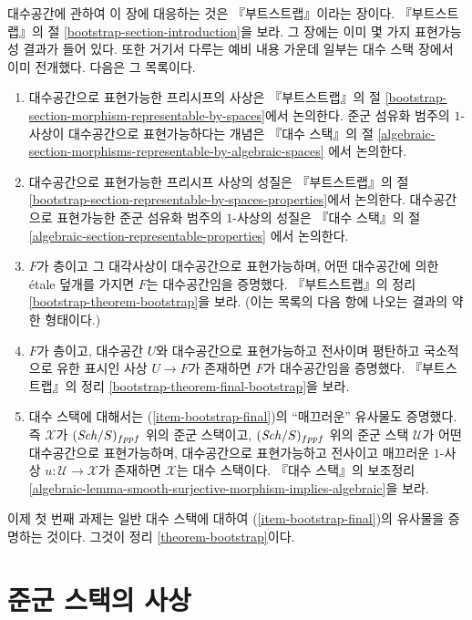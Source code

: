 \noindent
대수공간에 관하여 이 장에 대응하는 것은 『부트스트랩』이라는 장이다.
『부트스트랩』의 절 \ref{bootstrap-section-introduction}을 보라.
그 장에는 이미 몇 가지 표현가능성 결과가 들어 있다. 또한 거기서 다루는
예비 내용 가운데 일부는 대수 스택 장에서 이미 전개했다. 다음은 그 목록이다.
\begin{enumerate}
\item 대수공간으로 표현가능한 프리시프의 사상은 『부트스트랩』의 절
\ref{bootstrap-section-morphism-representable-by-spaces}에서 논의한다.
준군 섬유화 범주의 $1$-사상이 대수공간으로 표현가능하다는 개념은
『대수 스택』의 절
\ref{algebraic-section-morphisms-representable-by-algebraic-spaces}
에서 논의한다.
\item 대수공간으로 표현가능한 프리시프 사상의 성질은
『부트스트랩』의 절
\ref{bootstrap-section-representable-by-spaces-properties}에서 논의한다.
대수공간으로 표현가능한 준군 섬유화 범주의 $1$-사상의 성질은
『대수 스택』의 절
\ref{algebraic-section-representable-properties}
에서 논의한다.
\item $F$가 층이고 그 대각사상이 대수공간으로 표현가능하며,
어떤 대수공간에 의한 \'etale 덮개를 가지면 $F$는 대수공간임을 증명했다.
『부트스트랩』의 정리 \ref{bootstrap-theorem-bootstrap}을 보라.
(이는 목록의 다음 항에 나오는 결과의 약한 형태이다.)
\item
\label{item-bootstrap-final}
$F$가 층이고, 대수공간 $U$와 대수공간으로 표현가능하고 전사이며
평탄하고 국소적으로 유한 표시인 사상 $U \to F$가 존재하면
$F$가 대수공간임을 증명했다. 『부트스트랩』의 정리
\ref{bootstrap-theorem-final-bootstrap}을 보라.
\item 대수 스택에 대해서는 (\ref{item-bootstrap-final})의
“매끄러운” 유사물도 증명했다. 즉 $\mathcal{X}$가
$(\mathit{Sch}/S)_{fppf}$ 위의 준군 스택이고, $(\mathit{Sch}/S)_{fppf}$ 위의
준군 스택 $\mathcal{U}$가 어떤 대수공간으로 표현가능하며,
대수공간으로 표현가능하고 전사이고 매끄러운 $1$-사상
$u : \mathcal{U} \to \mathcal{X}$가 존재하면
$\mathcal{X}$는 대수 스택이다. 『대수 스택』의 보조정리
\ref{algebraic-lemma-smooth-surjective-morphism-implies-algebraic}을 보라.
\end{enumerate}
이제 첫 번째 과제는 일반 대수 스택에 대하여
(\ref{item-bootstrap-final})의 유사물을 증명하는 것이다.
그것이 정리 \ref{theorem-bootstrap}이다.



\section{준군 스택의 사상}
\label{section-1-morphisms}

